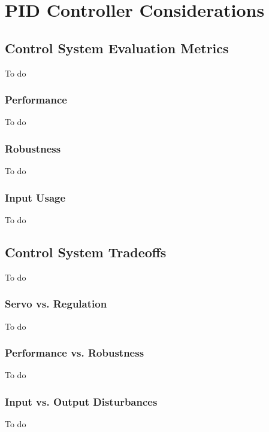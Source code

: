 \chapter{PID Controller Considerations}
\label{chap:PIDControllerDesign}

\section{Control System Evaluation Metrics}
To do
\subsection{Performance}
To do
\subsection{Robustness}
To do
\subsection{Input Usage}
To do
%

\section{Control System Tradeoffs}
To do
\subsection{Servo vs. Regulation}
To do
\subsection{Performance vs. Robustness}
To do
\subsection{Input vs. Output Disturbances}
To do